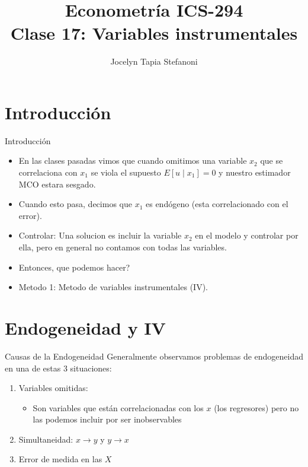 \documentclass[10pt]{beamer}
\title[ICS-162]{Econometría ICS-294\\ \small{Clase 17: Variables instrumentales}}
\author{Jocelyn Tapia Stefanoni}
\institute[USM]
{Universidad Técnica Federico Santa María\\ %
	\medskip
	\textit{} %
	
}
\date{}
\begin{document}
	
\begin{frame}
	\titlepage %
\end{frame}

\section{Introducción}

\begin{frame}{Introducción}
    \begin{itemize}
        \item En las clases pasadas vimos que cuando omitimos una variable $x_{2}$ que se correlaciona con $x_{1}$ se viola el supuesto $E\left[u \mid x_{1}\right]=0$ y nuestro estimador MCO estara sesgado.
        \item Cuando esto pasa, decimos que $x_{1}$ es endógeno (esta correlacionado con el error).
        \item Controlar: Una solucion es incluir la variable $x_{2}$ en el modelo y controlar por ella, pero en general no contamos con todas las variables.
        \item Entonces, que podemos hacer?
        \item Metodo 1: Metodo de variables instrumentales (IV).
    \end{itemize}
\end{frame}

\section{Endogeneidad y IV}

\begin{frame}{Causas de la Endogeneidad}
    Generalmente observamos problemas de endogeneidad en una de estas 3 situaciones:
    \begin{enumerate}
        \item Variables omitidas: 
        \begin{itemize}
            \item Son variables que están correlacionadas con los $x$ (los regresores) pero no las podemos incluir por ser inobservables
        \end{itemize}
        \item Simultaneidad: $x \rightarrow y$ y $y \rightarrow x$
        \item Error de medida en las $X$
    \end{enumerate}
\end{frame}
\end{document}
